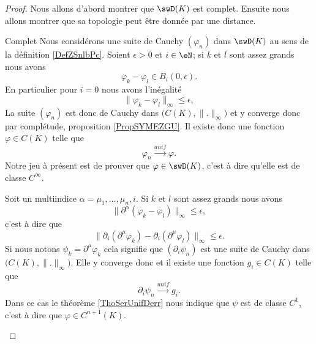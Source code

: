 \begin{proof}

    Nous allons d'abord montrer que \( \swD(K)\) est complet. Ensuite nous allons montrer que sa topologie peut être donnée par une distance.

    \begin{subproof}
        \item[Complet]
            Nous considérons une suite de Cauchy \( (\varphi_n)\) dans \( \swD(K)\) au sens de la définition \ref{DefZSnlbPc}. Soient \( \epsilon>0\) et \( i\in \eN\); si \( k\) et \( l\) sont assez grands nous avons
            \begin{equation}
                \varphi_k-\varphi_l\in B_i(0,\epsilon).
            \end{equation}
            En particulier pour \( i=0\) nous avons l'inégalité
            \begin{equation}
                \| \varphi_k-\varphi_l \|_{\infty}\leq \epsilon,
            \end{equation}
            La suite \( (\varphi_n)\) est donc de Cauchy dans \( \big( C(K),\| . \|_{\infty} \big)\) et y converge donc par complétude, proposition \ref{PropSYMEZGU}. Il existe donc une fonction \( \varphi\in C(K)\) telle que
            \begin{equation}
                \varphi_n\stackrel{unif}{\longrightarrow}\varphi.
            \end{equation}
            Notre jeu à présent est de prouver que \( \varphi\in\swD(K)\), c'est à dire qu'elle est de classe \(  C^{\infty}\). 

            Soit un multiindice \( \alpha=\mu_1,\ldots, \mu_n,i\). Si \( k\) et \( l\) sont assez grands nous avons
            \begin{equation}
                \| \partial^{\alpha}(\varphi_k-\varphi_l) \|_{\infty}\leq \epsilon,
            \end{equation}
            c'est à dire que 
            \begin{equation}
                \| \partial_i(\partial^{\mu}\varphi_k)-\partial_i(\partial^{\mu}\varphi_l) \|_{\infty}\leq \epsilon.
            \end{equation}
            Si nous notons \( \psi_k=\partial^{\mu}\varphi_k\) cela signifie que \( (\partial_i\psi_n)\) est une suite de Cauchy dans \( \big( C(K),\| . \|_{\infty} \big)\). Elle y converge donc et il existe une fonction \( g_i\in C(K)\) telle que
            \begin{equation}
                \partial_i\psi_n\stackrel{unif}{\longrightarrow}g_i.
            \end{equation}
            Dans ce cas le théorème \ref{ThoSerUnifDerr} nous indique que \( \psi\) est de classe \( C^1\), c'est à dire que \( \varphi\in C^{n+1}(K)\).


\end{subproof}
\end{proof}
